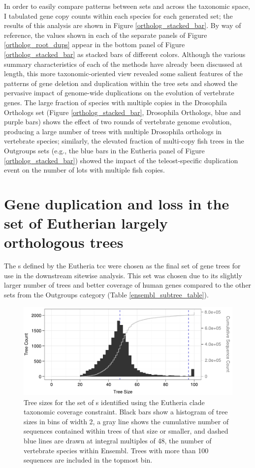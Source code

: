 In order to easily compare patterns between \subtr sets and across the
taxonomic space, I tabulated gene copy counts within each \ens species
for each generated \subtr set; the results of this analysis are shown
in Figure \ref{ortholog_stacked_bar}. By way of reference, the values
shown in each of the separate panels of Figure
\ref{ortholog_root_dups} appear in the bottom panel of Figure
\ref{ortholog_stacked_bar} as stacked bars of different
colors. Although the various summary characteristics of each of the
\subtr methods have already been discussed at length, this more
taxonomic-oriented view revealed some salient features of the patterns
of gene deletion and duplication within the tree sets and showed the
pervasive impact of genome-wide duplications on the evolution of
vertebrate genes. The large fraction of species with multiple copies
in the Drosophila Orthologs \subtr set (Figure
\ref{ortholog_stacked_bar}, Drosophila Orthologs, blue and purple
bars) shows the effect of two rounds of vertebrate genome evolution,
producing a large number of trees with multiple Drosophila orthologs
in vertebrate species; similarly, the elevated fraction of multi-copy
fish trees in the Outgroups \subtr sets (e.g., the blue bars in the
Eutheria panel of Figure \ref{ortholog_stacked_bar}) showed the impact
of the teleost-specific duplication event on the number of \mammln{}
\acp{lot} with multiple fish copies.

\section{Gene duplication and loss in the set of Eutherian largely orthologous trees}

The \subtr{}s defined by the Eutheria \ac{tcc} were chosen as the
final set of gene trees for use in the downstream sitewise
analysis. This set was chosen due to its slightly larger number of
trees and better coverage of human genes compared to the other \subtr
sets from the Outgroups category (Table \ref{ensembl_subtree_table}).

\begin{figure}
\centering
\includegraphics[scale=0.9]{Figs/hist_euth_roots.pdf}
\caption{Tree sizes for the set of \subtr{}s identified using the
  Eutheria clade taxonomic coverage constraint. Black bars show a
  histogram of tree sizes in bins of width 2, a gray line shows
  the cumulative number of sequences contained within trees of that
  size or smaller, and dashed blue lines are drawn at integral
  multiples of 48, the number of vertebrate species within
  Ensembl. Trees with more than 100 sequences are included in the
  topmost bin.}
\label{fig_ensembl_euth_hist}
\end{figure}


